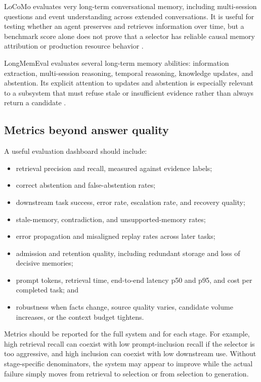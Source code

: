 LoCoMo evaluates very long-term conversational memory, including multi-session questions and event understanding across extended conversations. It is useful for testing whether an agent preserves and retrieves information over time, but a benchmark score alone does not prove that a selector has reliable causal memory attribution or production resource behavior \autocite{maharana2024locomo}.

LongMemEval evaluates several long-term memory abilities: information extraction, multi-session reasoning, temporal reasoning, knowledge updates, and abstention. Its explicit attention to updates and abstention is especially relevant to a subsystem that must refuse stale or insufficient evidence rather than always return a candidate \autocite{wu2025longmemeval}.

\subsection{Metrics beyond answer quality}
\label{subsec:ch12-metrics}

A useful evaluation dashboard should include:

\begin{itemize}
  \item retrieval precision and recall, measured against evidence labels;
  \item correct abstention and false-abstention rates;
  \item downstream task success, error rate, escalation rate, and recovery quality;
  \item stale-memory, contradiction, and unsupported-memory rates;
  \item error propagation and misaligned replay rates across later tasks;
  \item admission and retention quality, including redundant storage and loss of decisive memories;
  \item prompt tokens, retrieval time, end-to-end latency p50 and p95, and cost per completed task; and
  \item robustness when facts change, source quality varies, candidate volume increases, or the context budget tightens.
\end{itemize}

Metrics should be reported for the full system and for each stage. For example, high retrieval recall can coexist with low prompt-inclusion recall if the selector is too aggressive, and high inclusion can coexist with low downstream use. Without stage-specific denominators, the system may appear to improve while the actual failure simply moves from retrieval to selection or from selection to generation.


